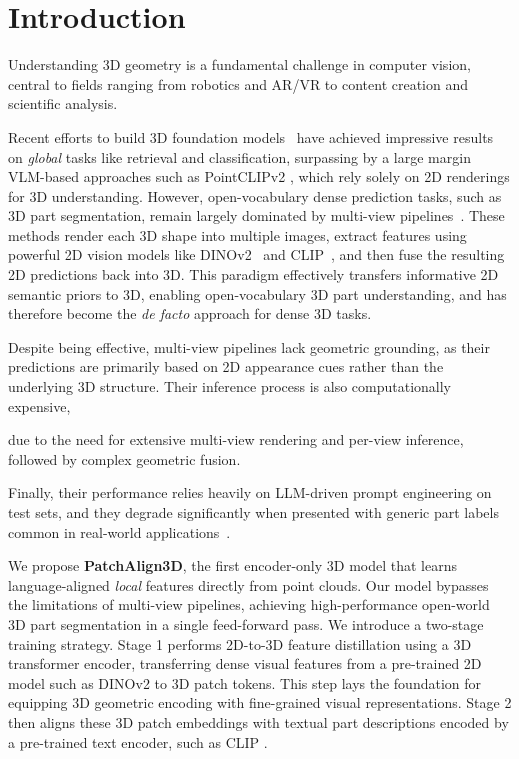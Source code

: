 \section{Introduction}
\label{sec:intro}

Understanding 3D geometry is a fundamental challenge in computer vision, central to fields ranging from robotics and AR/VR to content creation and scientific analysis.

Recent efforts to build 3D foundation models~\cite{xue2023ulip, liu2023openshape, zhou2023uni3d} have achieved impressive results on \emph{global} tasks like retrieval and classification, surpassing by a large margin VLM-based approaches such as PointCLIPv2 \cite{zhu2022pointclip}, which rely solely on 2D renderings for 3D understanding. However, open-vocabulary dense prediction tasks, such as 3D part segmentation, remain largely dominated by multi-view pipelines~\cite{zhu2022pointclip, liu2023partslip, abdelreheem2023satr, garosi20253d}. These methods render each 3D shape into multiple images, extract features using powerful 2D vision models like DINOv2~\cite{oquab2023dinov2} and CLIP~\cite{radford2021learning}, and then fuse the resulting 2D predictions back into 3D. This paradigm effectively transfers informative 2D semantic priors to 3D, enabling open-vocabulary 3D part understanding, and has therefore become the \emph{de facto} approach for dense 3D tasks.

Despite being effective, multi-view pipelines lack geometric grounding, as their predictions are primarily based on 2D appearance cues rather than the underlying 3D structure. Their inference process is also computationally expensive,  

due to the need for extensive multi-view rendering and per-view inference, followed by complex geometric fusion. 

Finally, their performance relies heavily on LLM-driven prompt engineering on test sets, and they degrade significantly when presented with generic part labels common in real-world applications~\cite{garosi20253d}.



We propose \textbf{PatchAlign3D}, the first encoder-only 3D model that learns language-aligned \emph{local} features directly from point clouds. 
Our model bypasses the limitations of multi-view pipelines, achieving high-performance open-world 3D part segmentation in a single feed-forward pass.
We introduce a two-stage training strategy. Stage 1 performs 2D-to-3D feature distillation using a 3D transformer encoder, transferring dense visual features from a pre-trained 2D model such as DINOv2 \cite{oquab2023dinov2} to 3D patch tokens. This step lays the foundation for equipping 3D geometric encoding with fine-grained visual representations. Stage 2 then aligns these 3D patch embeddings with textual part descriptions encoded by a pre-trained text encoder, such as CLIP \cite{radford2021learning}.

